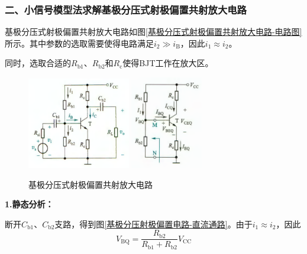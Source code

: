 \subsubsection{二、小信号模型法求解基极分压式射极偏置共射放大电路}

基极分压式射极偏置共射放大电路如图\ref{基极分压式射极偏置共射放大电路-电路图}所示。其中参数的选取需要使得电路满足$i_2\gg i_{\mathrm{B}}$，因此$i_1\approx i_{\mathrm{2}}$。

同时，选取合适的$R_{\mathrm{b1}}$、$R_{\mathrm{b2}}$和$R_{\mathrm{c}}$使得BJT工作在放大区。

\begin{figure}[htb]
    \centering
        {\includegraphics[width=0.4\textwidth]{pic/基极分压式射极偏置共射放大电路-无射极旁路电容.png}}\qquad
        {\includegraphics[width=0.28\textwidth]{pic/基极分压射极偏置电路-直流通路.png}}
        \caption{基极分压式射极偏置共射放大电路\label{基极分压式射极偏置共射放大电路}}
\end{figure}

\textbf{1.静态分析：}

断开$C_{\mathrm{b1}}$、$C_{\mathrm{b2}}$支路，得到图\ref{基极分压射极偏置电路-直流通路}。由于$i_1\approx i_{\mathrm{2}}$，因此
\begin{equation}
    V_{\mathrm{BQ}}=\frac{R_{\mathrm{b2}}}{R_{\mathrm{b1}}+R_{\mathrm{b2}}}V_{\mathrm{CC}}
\end{equation}

